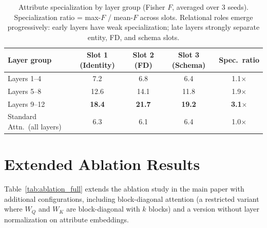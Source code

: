 \documentclass[conference]{IEEEtran}
\begin{document}
\begin{table}[tb]
\centering
\caption{Attribute specialization by layer group (Fisher $F$, averaged over 3 seeds). Specialization ratio = max-$F$ / mean-$F$ across slots. Relational roles emerge progressively: early layers have weak specialization; late layers strongly separate entity, FD, and schema slots.}
\label{tab:layer_probing}
\begin{tabular}{lcccc}
    \toprule
    \textbf{Layer group} & \textbf{Slot 1 (Identity)} & \textbf{Slot 2 (FD)} & \textbf{Slot 3 (Schema)} & \textbf{Spec.\ ratio} \\
    \midrule
    Layers 1--4  & 7.2 & 6.8 & 6.4 & 1.1$\times$ \\
    Layers 5--8  & 12.6 & 14.1 & 11.8 & 1.9$\times$ \\
    Layers 9--12 & \textbf{18.4} & \textbf{21.7} & \textbf{19.2} & \textbf{3.1$\times$} \\
    \midrule
    Standard Attn.\ (all layers) & 6.3 & 6.1 & 6.4 & 1.0$\times$ \\
    \bottomrule
\end{tabular}
\end{table}

\section{Extended Ablation Results}
\label{app:ablation}

Table~\ref{tab:ablation_full} extends the ablation study in the main paper with additional configurations, including block-diagonal attention (a restricted variant where $W_Q$ and $W_K$ are block-diagonal with $k$ blocks) and a version without layer normalization on attribute embeddings.
\end{document}
